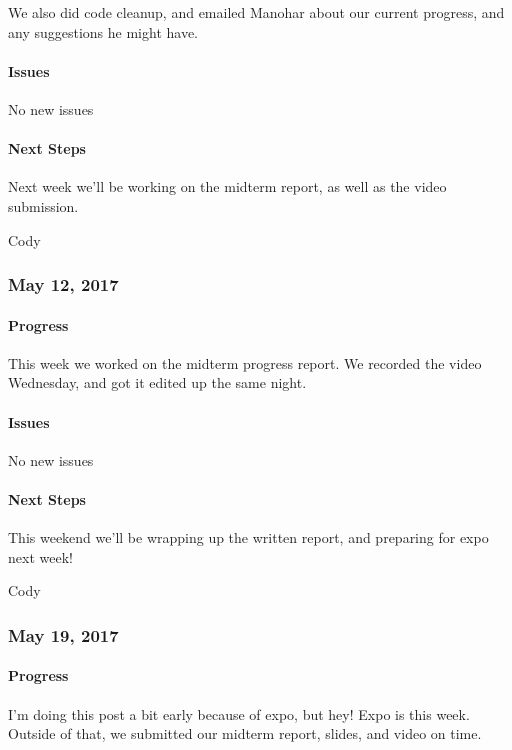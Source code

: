 \documentclass[10pt,onecolumn,journal,draftclsnofoot]{IEEEtran}
\begin{document}
We also did code cleanup, and emailed Manohar about our current
progress, and any suggestions he might have.

\paragraph{Issues} 

No new issues

\paragraph{Next Steps} 

Next week we'll be working on the midterm report, as well as the video
submission.

Cody

\subsubsection{May 12, 2017} 

\paragraph{Progress} 

This week we worked on the midterm progress report. We recorded the
video Wednesday, and got it edited up the same night.

\paragraph{Issues} 

No new issues

\paragraph{Next Steps} 

This weekend we'll be wrapping up the written report, and preparing for
expo next week!

Cody

\subsubsection{May 19, 2017} 

\paragraph{Progress} 

I'm doing this post a bit early because of expo, but hey! Expo is this
week. Outside of that, we submitted our midterm report, slides, and
video on time.
\end{document}
